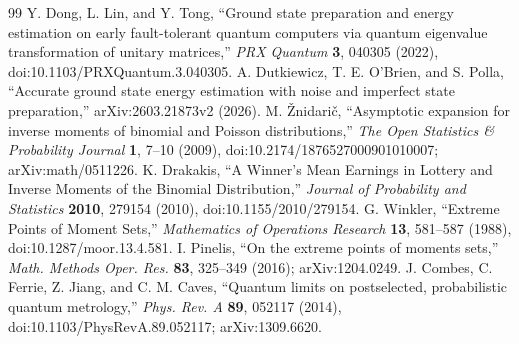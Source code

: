\begin{thebibliography}{99}
 Y. Dong, L. Lin, and Y. Tong, ``Ground state preparation and energy estimation on early fault-tolerant quantum computers via quantum eigenvalue transformation of unitary matrices,'' \emph{PRX Quantum} \textbf{3}, 040305 (2022), doi:10.1103/PRXQuantum.3.040305.
 A. Dutkiewicz, T. E. O'Brien, and S. Polla, ``Accurate ground state energy estimation with noise and imperfect state preparation,'' arXiv:2603.21873v2 (2026).
 M. \v{Z}nidari\v{c}, ``Asymptotic expansion for inverse moments of binomial and Poisson distributions,'' \emph{The Open Statistics \& Probability Journal} \textbf{1}, 7--10 (2009), doi:10.2174/1876527000901010007; arXiv:math/0511226.
 K. Drakakis, ``A Winner's Mean Earnings in Lottery and Inverse Moments of the Binomial Distribution,'' \emph{Journal of Probability and Statistics} \textbf{2010}, 279154 (2010), doi:10.1155/2010/279154.
 G. Winkler, ``Extreme Points of Moment Sets,'' \emph{Mathematics of Operations Research} \textbf{13}, 581--587 (1988), doi:10.1287/moor.13.4.581.
 I. Pinelis, ``On the extreme points of moments sets,'' \emph{Math. Methods Oper. Res.} \textbf{83}, 325--349 (2016); arXiv:1204.0249.
 J. Combes, C. Ferrie, Z. Jiang, and C. M. Caves, ``Quantum limits on postselected, probabilistic quantum metrology,'' \emph{Phys. Rev. A} \textbf{89}, 052117 (2014), doi:10.1103/PhysRevA.89.052117; arXiv:1309.6620.
\end{thebibliography}

